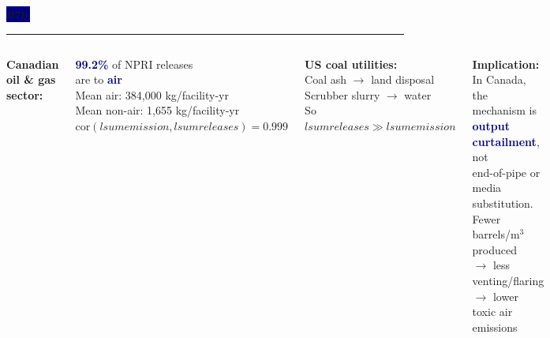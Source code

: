 \documentclass[aspectratio=169,12pt]{beamer}
\newcommand{\badge}[2][Navy]{%
  \colorbox{#1}{\color{white}\,\textbf{\small #2}\,}%
}
\newcommand{\hi}[1]{\textcolor{Navy}{\textbf{#1}}}
\begin{document}
\begin{frame}
\badge{07b}
\vspace{0.5em}\par
{\color{Blue}\rule{\linewidth}{0.8pt}}\par
\vspace{0.5em}

\begin{columns}[T]
\textbf{Canadian oil \& gas sector:}

\vspace{0.4em}
\begin{tcolorbox}[resultbox]
\hi{99.2\%} of NPRI releases\\
are to \hi{air}\\[4pt]
{\small Mean air: 384,000 kg/facility-yr\\
Mean non-air: \phantom{0}1,655 kg/facility-yr}\\[4pt]
$\mathrm{cor}(lsumemission, lsumreleases) = 0.999$
\end{tcolorbox}

\textbf{US coal utilities:}\\[4pt]
{\small Coal ash $\rightarrow$ land disposal\\
Scrubber slurry $\rightarrow$ water\\
So $lsumreleases \gg lsumemission$}

\vspace{0.7em}
\textbf{Implication:}\\[4pt]
{\small In Canada, the mechanism is\\
\hi{output curtailment}, not\\
end-of-pipe or media substitution.\\[4pt]
Fewer barrels/m$^3$ produced\\
$\rightarrow$ less venting/flaring\\
$\rightarrow$ lower toxic air emissions}
\end{columns}
\end{frame}
\end{document}
